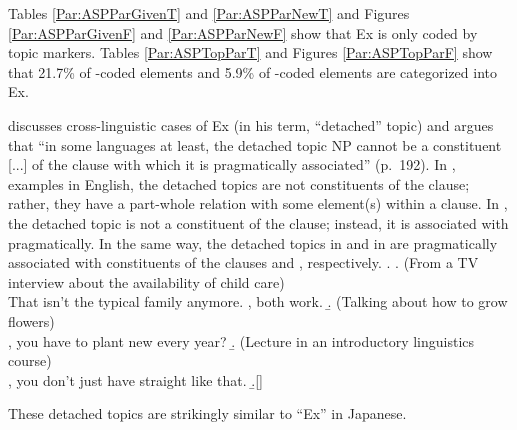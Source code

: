 Tables \ref{Par:ASPParGivenT} and \ref{Par:ASPParNewT} and
Figures \ref{Par:ASPParGivenF} and \ref{Par:ASPParNewF}
show that Ex is only coded by topic markers.
Tables \ref{Par:ASPTopParT} and Figures \ref{Par:ASPTopParF}
show that 21.7\% of -coded elements and
5.9\% of -coded elements are categorized into Ex.

discusses cross-linguistic cases of Ex (in his term, ``detached'' topic)
and argues that
``in some languages at least, the detached topic NP cannot be a constituent [...] of the clause with which it is pragmatically associated'' (p.~192).
In \Next, examples in English,
the detached topics are not constituents of the clause;
rather, they have a part-whole relation with some element(s) within a clause.
In \Next[a], the detached topic  is not a constituent of the clause;
instead, it is associated with  pragmatically.
In the same way, the detached topics  in \Next[b] and
 in \Next[c]
are pragmatically associated with constituents of the clauses  and , respectively.
%
\ex.
 \a. (From a TV interview about the availability of child care) \\
   That isn't the typical family anymore.
   ,
    both work.
 \b. (Talking about how to grow flowers) \\
   , you have to plant new  every year?
 \b. (Lecture in an introductory linguistics course) \\
   , you don't just have straight  like that.
  \b.[] \hfill{\cite[193]{lambrecht94}}

These detached topics are strikingly similar to
``Ex'' in Japanese.


